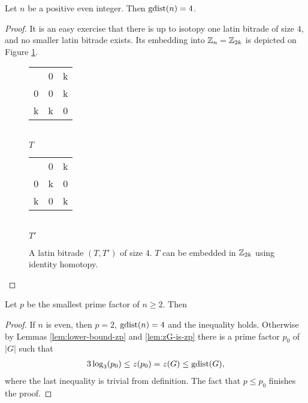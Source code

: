 \begin{lem}
Let $n$ be a positive even integer. Then $\mathop{\mathrm{gdist}}(n) = 4$.
\end{lem}
\begin{proof}
It is an easy exercise that there is up to isotopy one latin bitrade of size $4$, and no smaller latin bitrade exists. Its embedding into $\mathbb Z_n = \mathbb Z_{2k}$ is depicted on Figure \ref{fig:intercalates}.

\begin{figure}[htb]
	\centering
	\begin{minipage}{.30\linewidth}
		\begin{center}
\begin{tabular}{ c | c c |}
\multicolumn{1}{c}{}
 &  \multicolumn{1}{c}{0}
 & \multicolumn{1}{c}{k} \\
\cline{2-3}
0 & 0 & k \\
k & k & 0 \\
\cline{2-3}
\end{tabular} \\
		\bigskip
		$T$
		\end{center}
	\end{minipage}
	\begin{minipage}{.30\linewidth}
		\begin{center}
\begin{tabular}{ c | c c |}
\multicolumn{1}{c}{}
 &  \multicolumn{1}{c}{0}
 & \multicolumn{1}{c}{k} \\
\cline{2-3}
0 & k & 0 \\
k & 0 & k \\
\cline{2-3}
\end{tabular} \\
		\bigskip
		$T'$
		\end{center}
	\end{minipage}
	\caption{A latin bitrade $(T, T')$ of size 4. $T$ can be embedded in $\mathbb Z_{2k}$ using identity homotopy.}
	\label{fig:intercalates}
\end{figure}
\end{proof}


\begin{thm}
\label{thm:lower-bound}
Let $p$ be the smallest prime factor of $n \geq 2$. Then
%
\end{thm}%
\begin{proof}
If $n$ is even, then $p=2$, $\mathop{\mathrm{gdist}}(n) = 4$ and the inequality holds. Otherwise by Lemmas \ref{lem:lower-bound-zp} and \ref{lem:zG-is-zp} there is a prime factor $p_0$ of $|G|$ such that
\begin{align}
	3 \log_3(p_0) \leq z(p_0) = z(G) \leq \mathop{\mathrm{gdist}}(G),
\end{align}
where the last inequality is trivial from definition. The fact that $p \leq p_0$ finishes the proof.
\end{proof}
